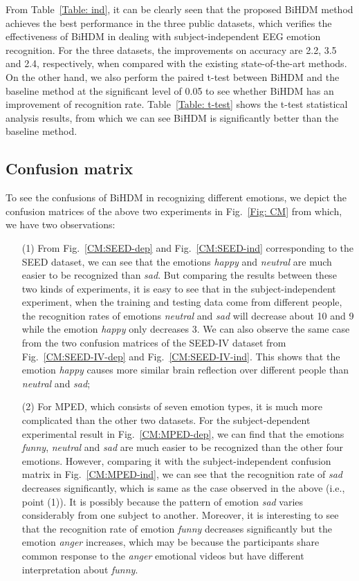 \documentclass[journal]{IEEEtran}
\begin{document}
From Table~\ref{Table: ind}, it can be clearly seen that the proposed BiHDM method achieves the best performance in the three public datasets, which verifies the effectiveness of BiHDM in dealing with subject-independent EEG emotion recognition. For the three datasets, the improvements on accuracy are 2.2, 3.5 and 2.4, respectively, when compared with the existing state-of-the-art methods. On the other hand, we also perform the paired t-test between BiHDM and the baseline method at the significant level of 0.05 to see whether BiHDM has an improvement of recognition rate. Table~\ref{Table: t-test} shows the t-test statistical analysis results, from which we can see BiHDM is significantly better than the baseline method.





\subsection{Confusion matrix}
To see the confusions of BiHDM in recognizing different emotions, we depict the confusion matrices of the above two experiments in Fig.~\ref{Fig: CM} from which, we have two observations:
\begin{itemize}
	\item [(1)] From Fig.~\ref{CM:SEED-dep} and Fig.~\ref{CM:SEED-ind} corresponding to the SEED dataset, we can see that the emotions \textit{happy} and \textit{neutral} are much easier to be recognized than \textit{sad}. But comparing the results between these two kinds of experiments, it is easy to see that in the subject-independent experiment, when the training and testing data come from different people, the recognition rates of emotions \textit{neutral} and \textit{sad} will decrease about 10 and 9 while the emotion \textit{happy} only decreases 3. We can also observe the same case from the two confusion matrices of the SEED-IV dataset from Fig.~\ref{CM:SEED-IV-dep} and Fig.~\ref{CM:SEED-IV-ind}. This shows that the emotion \textit{happy} causes more similar brain reflection over different people than \textit{neutral} and \textit{sad};
	\item [(2)] For MPED, which consists of seven emotion types, it is much more complicated than the other two datasets. For the subject-dependent experimental result in Fig.~\ref{CM:MPED-dep}, we can find that the emotions \textit{funny}, \textit{neutral} and \textit{sad} are much easier to be recognized than the other four emotions. However, comparing it with the subject-independent confusion matrix in Fig.~\ref{CM:MPED-ind}, we can see that the recognition rate of \textit{sad} decreases significantly, which is same as the case observed in the above (i.e., point (1)). It is possibly because the pattern of emotion \textit{sad} varies considerably from one subject to another. Moreover, it is interesting to see that the recognition rate of emotion \textit{funny} decreases significantly but the emotion \textit{anger} increases, which may be because the participants share common response to the \textit{anger} emotional videos but have different interpretation about \textit{funny}.
\end{itemize}
\end{document}
